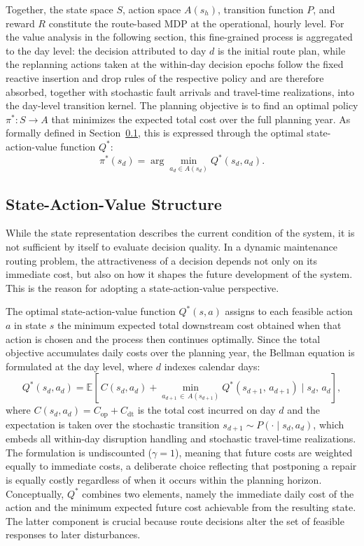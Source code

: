 \documentclass[12pt,oneside]{article}
\begin{document}
Together, the state space $S$, action space $A(s_h)$, transition function $P$, and reward $R$ constitute the route-based MDP at the operational, hourly level. For the value analysis in the following section, this fine-grained process is aggregated to the day level: the decision attributed to day $d$ is the initial route plan, while the replanning actions taken at the within-day decision epochs follow the fixed reactive insertion and drop rules of the respective policy and are therefore absorbed, together with stochastic fault arrivals and travel-time realizations, into the day-level transition kernel. The planning objective is to find an optimal policy $\pi^*: S \to A$ that minimizes the expected total cost over the full planning year. As formally defined in Section~\ref{subsec_stateactionvalue_structure}, this is expressed through the optimal state-action-value function $Q^*$:
\[
  \pi^*(s_d) = \arg\min_{a_d \in A(s_d)} Q^*(s_d, a_d).
\]


\subsection{State-Action-Value Structure}\label{subsec_stateactionvalue_structure}
While the state representation describes the current condition of the system, it is not sufficient by itself to evaluate decision quality. In a dynamic maintenance routing problem, the attractiveness of a decision depends not only on its immediate cost, but also on how it shapes the future development of the system. This is the reason for adopting a state-action-value perspective.

The optimal state-action-value function $Q^*(s, a)$ assigns to each feasible action $a$ in state $s$ the minimum expected total downstream cost obtained when that action is chosen and the process then continues optimally. Since the total objective accumulates daily costs over the planning year, the Bellman equation is formulated at the day level, where $d$ indexes calendar days:
\[
  Q^*(s_d, a_d) = \mathbb{E}\!\left[\,C(s_d, a_d)
    + \min_{a_{d+1}\,\in\, A(s_{d+1})} Q^*(s_{d+1},\, a_{d+1})
    \;\Big|\; s_d,\, a_d \right],
\]
where $C(s_d, a_d) = C_{\mathrm{op}} + C_{\mathrm{dt}}$ is the total cost incurred on day $d$ and the expectation is taken over the stochastic transition $s_{d+1} \sim P(\cdot \mid s_d, a_d)$, which embeds all within-day disruption handling and stochastic travel-time realizations. The formulation is undiscounted ($\gamma = 1$), meaning that future costs are weighted equally to immediate costs, a deliberate choice reflecting that postponing a repair is equally costly regardless of when it occurs within the planning horizon. Conceptually, $Q^*$ combines two elements, namely the immediate daily cost of the action and the minimum expected future cost achievable from the resulting state. The latter component is crucial because route decisions alter the set of feasible responses to later disturbances.
\end{document}
